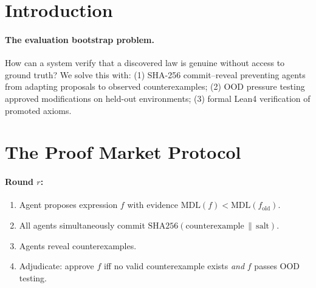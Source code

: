 \documentclass{article}
\begin{document}
\maketitle

\begin{abstract}
We present the Adversarial Proof Market, a mechanism for multi-agent
mathematical discovery that prevents overfitting, collusion, and false
discoveries through cryptographic commitment and out-of-distribution testing.
The market converges in
$7.80 \pm 0.74$ rounds
($n=10$).
The Chinese Remainder Theorem emerges spontaneously from joint stream
compression with success rate
$0.87 \pm 0.07$.
We extend the system to four layers of recursive self-improvement and
demonstrate knowledge accumulation across 30
sessions (12 verified axioms).
\end{abstract}

\section{Introduction}

\paragraph{The evaluation bootstrap problem.}
How can a system verify that a discovered law is genuine without access
to ground truth? We solve this with:
(1) SHA-256 commit--reveal preventing agents from adapting proposals to
observed counterexamples;
(2) OOD pressure testing approved modifications on held-out environments;
(3) formal Lean4 verification of promoted axioms.

\section{The Proof Market Protocol}

\paragraph{Round $r$:}
\begin{enumerate}
  \item Agent proposes expression $f$ with evidence
        $\mathrm{MDL}(f) < \mathrm{MDL}(f_{\text{old}})$.
  \item All agents simultaneously commit
        $\mathrm{SHA256}(\text{counterexample} \,\|\, \text{salt})$.
  \item Agents reveal counterexamples.
  \item Adjudicate: approve $f$ iff no valid counterexample exists
        \emph{and} $f$ passes OOD testing.
\end{enumerate}
\end{document}
